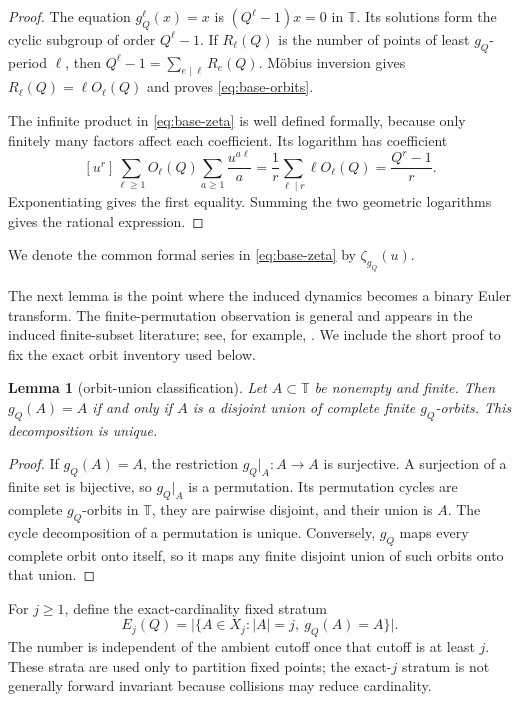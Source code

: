 \documentclass[11pt,a4paper]{amsart}
\newtheorem{lemma}[theorem]{Lemma}
\theoremstyle{definition}
\theoremstyle{remark}
\newcommand{\T}{\mathbb T}
\newcommand{\card}[1]{\lvert #1\rvert}
\begin{document}
\begin{proof}
The equation $g_Q^\ell(x)=x$ is
$(Q^\ell-1)x=0$ in $\T$.  Its solutions form the cyclic subgroup of order
$Q^\ell-1$.  If $R_\ell(Q)$ is the number of points of least $g_Q$-period
$\ell$, then
$Q^\ell-1=\sum_{e\mid\ell}R_e(Q)$.  M\"obius inversion gives
$R_\ell(Q)=\ell O_\ell(Q)$ and proves \eqref{eq:base-orbits}.

The infinite product in \eqref{eq:base-zeta} is well defined formally,
because only finitely many factors affect each coefficient.  Its logarithm
has coefficient
\[
 [u^r]\sum_{\ell\geq1}O_\ell(Q)
       \sum_{a\geq1}\frac{u^{a\ell}}a
 =\frac1r\sum_{\ell\mid r}\ell O_\ell(Q)
 =\frac{Q^r-1}{r}.
\]
Exponentiating gives the first equality.  Summing the two geometric
logarithms gives the rational expression.
\end{proof}

We denote the common formal series in \eqref{eq:base-zeta} by
$\zeta_{g_Q}(u)$.

The next lemma is the point where the induced dynamics becomes a binary
Euler transform.  The finite-permutation observation is general and appears
in the induced finite-subset literature; see, for example,
\cite[Lemma~4.7]{HigueraIllanes2011}.  We include the short proof to fix the
exact orbit inventory used below.

\begin{lemma}[orbit-union classification]\label{lem:union}
Let $A\subset\T$ be nonempty and finite.  Then $g_Q(A)=A$ if and only if
$A$ is a disjoint union of complete finite $g_Q$-orbits.  This decomposition
is unique.
\end{lemma}

\begin{proof}
If $g_Q(A)=A$, the restriction $g_Q|_A:A\to A$ is surjective.  A surjection
of a finite set is bijective, so $g_Q|_A$ is a permutation.  Its permutation
cycles are complete $g_Q$-orbits in $\T$, they are pairwise disjoint, and
their union is $A$.  The cycle decomposition of a permutation is unique.
Conversely, $g_Q$ maps every complete orbit onto itself, so it maps any
finite disjoint union of such orbits onto that union.
\end{proof}

For $j\geq1$, define the exact-cardinality fixed stratum
\[
 E_j(Q)=\card{\{A\in X_j:\card A=j,\ g_Q(A)=A\}}.
\]
The number is independent of the ambient cutoff once that cutoff is at least
$j$.  These strata are used only to partition fixed points; the exact-$j$
stratum is not generally forward invariant because collisions may reduce
cardinality.
\end{document}

